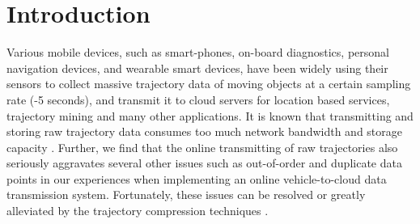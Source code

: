 \section{Introduction}
\label{sec-into}

Various mobile devices, such as smart-phones, on-board diagnostics, personal navigation devices, and wearable smart devices, have been widely using their sensors to collect massive trajectory data of moving objects at a certain sampling rate (-5 seconds), and transmit it to cloud servers for location based services, trajectory mining and many other applications.
%
It is known that transmitting and storing raw trajectory data consumes too much network bandwidth and storage capacity \cite{Chen:Trajectory,  Chen:Fast, Meratnia:Spatiotemporal, Keogh:online, Liu:BQS, Muckell:Compression,Cao:Spatio, Popa:Spatio, Schmid:Semantic,Richter:Semantic,Long:Direction,Nibali:Trajic}.
Further, we find that the online transmitting of raw trajectories also seriously aggravates several other issues such as out-of-order and duplicate data points in our experiences when implementing an online vehicle-to-cloud data transmission system.
Fortunately, these issues can be resolved or greatly alleviated by the trajectory compression techniques \cite{Douglas:Peucker, Hershberger:Speeding, Meratnia:Spatiotemporal, Liu:BQS, Muckell:Compression, Chen:Trajectory, Chen:Fast, Keogh:online, Cao:Spatio, Shi:Survey, Richter:Semantic ,Long:Direction, Song:PRESS, Nibali:Trajic}.

